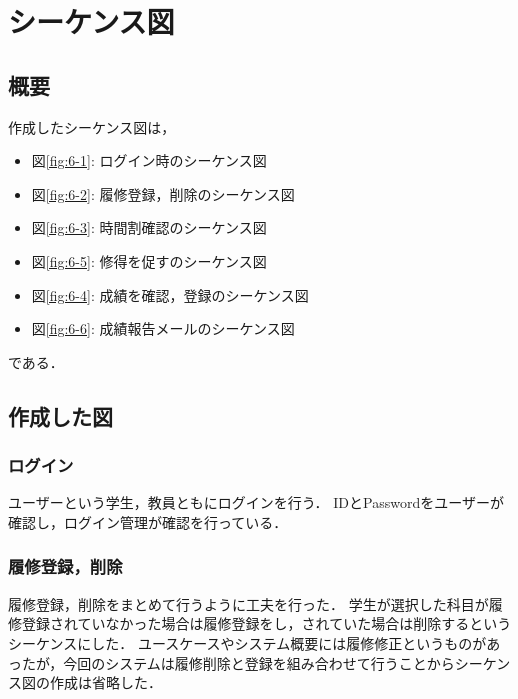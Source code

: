 \documentclass[documentclass]{jsarticle}
\begin{document}
\newpage

\section{シーケンス図}
\subsection*{概要}
作成したシーケンス図は，
\begin{itemize}
  \item 図\ref*{fig:6-1}: ログイン時のシーケンス図
  \item 図\ref*{fig:6-2}: 履修登録，削除のシーケンス図
  \item 図\ref*{fig:6-3}: 時間割確認のシーケンス図
  \item 図\ref*{fig:6-5}: 修得を促すのシーケンス図
  \item 図\ref*{fig:6-4}: 成績を確認，登録のシーケンス図
  \item 図\ref*{fig:6-6}: 成績報告メールのシーケンス図
\end{itemize}
である．


\subsection*{作成した図}
\subsubsection*{ログイン}
ユーザーという学生，教員ともにログインを行う．
IDとPasswordをユーザーが確認し，ログイン管理が確認を行っている．

\subsubsection*{履修登録，削除}
履修登録，削除をまとめて行うように工夫を行った．
学生が選択した科目が履修登録されていなかった場合は履修登録をし，されていた場合は削除するというシーケンスにした．
ユースケースやシステム概要には履修修正というものがあったが，今回のシステムは履修削除と登録を組み合わせて行うことからシーケンス図の作成は省略した．
\end{document}
